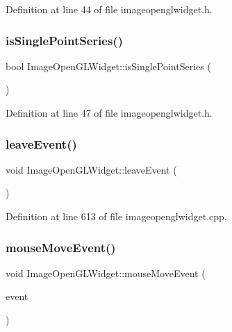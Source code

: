 Definition at line 44 of file imageopenglwidget.\+h.

\mbox{\label{class_image_open_g_l_widget_a5420820b5b94c4362d4031659b3f4268}} 
\subsubsection{\texorpdfstring{isSinglePointSeries()}{isSinglePointSeries()}}
{\footnotesize\ttfamily bool Image\+Open\+G\+L\+Widget\+::is\+Single\+Point\+Series (\begin{DoxyParamCaption}{ }\end{DoxyParamCaption})\hspace{0.3cm}{\ttfamily [inline]}}



Definition at line 47 of file imageopenglwidget.\+h.

\mbox{\label{class_image_open_g_l_widget_ab92a330665a31c7dc8216d5f4af01f93}} 
\subsubsection{\texorpdfstring{leaveEvent()}{leaveEvent()}}
{\footnotesize\ttfamily void Image\+Open\+G\+L\+Widget\+::leave\+Event (\begin{DoxyParamCaption}\item[{Q\+Event $\ast$}]{ }\end{DoxyParamCaption})\hspace{0.3cm}{\ttfamily [protected]}}



Definition at line 613 of file imageopenglwidget.\+cpp.

\mbox{\label{class_image_open_g_l_widget_aaee9c377ff4d9fa3f9811da857d04ea5}} 
\subsubsection{\texorpdfstring{mouseMoveEvent()}{mouseMoveEvent()}}
{\footnotesize\ttfamily void Image\+Open\+G\+L\+Widget\+::mouse\+Move\+Event (\begin{DoxyParamCaption}\item[{Q\+Mouse\+Event $\ast$}]{event }\end{DoxyParamCaption})\hspace{0.3cm}{\ttfamily [protected]}}



